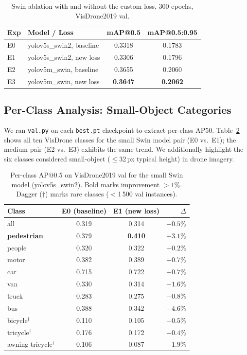 \documentclass[conference]{IEEEtran}
\begin{document}
\begin{table}[t]
\centering
\caption{Swin ablation with and without the custom loss, 300 epochs,
  VisDrone2019 val.}
\begin{tabular}{llcc}
\toprule
\textbf{Exp} & \textbf{Model / Loss}
  & \textbf{mAP@0.5} & \textbf{mAP@0.5:0.95} \\
\midrule
E0 & yolov5s\_swin2, baseline & 0.3318 & 0.1783 \\
E1 & yolov5s\_swin2, new loss & 0.3306 & 0.1796 \\
E2 & yolov5m\_swin, baseline  & 0.3655 & 0.2060 \\
E3 & yolov5m\_swin, new loss  & \textbf{0.3647} & \textbf{0.2062} \\
\bottomrule
\end{tabular}
\label{tab:swin_ablation}
\end{table}

\subsection{Per-Class Analysis: Small-Object Categories}
\label{sec:perclass}

We ran \texttt{val.py} on each \texttt{best.pt} checkpoint to extract
per-class AP50.  Table~\ref{tab:perclass} shows all ten VisDrone classes
for the small Swin model pair (E0 vs.\ E1); the medium pair (E2 vs.\ E3)
exhibits the same trend.  We additionally highlight the six classes
considered small-object ($\leq$32\,px typical height) in drone imagery.

\begin{table}[t]
\centering
\caption{Per-class AP@0.5 on VisDrone2019 val for the small Swin model
  (yolov5s\_swin2).  Bold marks improvement $>1\%$.  Dagger ($\dagger$)
  marks rare classes ($<$1\,500 val instances).}
\begin{tabular}{lccr}
\toprule
\textbf{Class} & \textbf{E0 (baseline)} & \textbf{E1 (new loss)} & \textbf{$\Delta$} \\
\midrule
all              & 0.319 & 0.314 & $-0.5\%$ \\
\textbf{pedestrian}     & 0.379 & \textbf{0.410} & $\mathbf{+3.1\%}$ \\
people           & 0.320 & 0.322 & $+0.2\%$ \\
motor            & 0.382 & 0.389 & $+0.7\%$ \\
car              & 0.715 & 0.722 & $+0.7\%$ \\
van              & 0.330 & 0.314 & $-1.6\%$ \\
truck            & 0.283 & 0.275 & $-0.8\%$ \\
bus              & 0.388 & 0.342 & $-4.6\%$ \\
bicycle$^\dagger$         & 0.110 & 0.105 & $-0.5\%$ \\
tricycle$^\dagger$        & 0.176 & 0.172 & $-0.4\%$ \\
awning-tricycle$^\dagger$ & 0.106 & 0.087 & $-1.9\%$ \\
\bottomrule
\end{tabular}
\label{tab:perclass}
\end{table}
\end{document}

